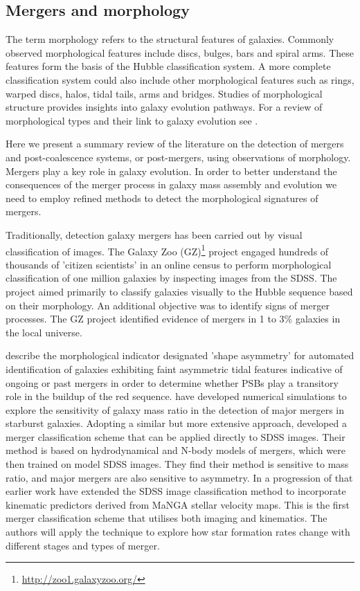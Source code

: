 \subsection{Mergers and morphology}
\label{sec:mergers}

The term morphology refers to the structural features of galaxies. Commonly observed morphological features include discs, bulges, bars and spiral arms. These features form the basis of the Hubble classification system. A more complete classification system could also include other morphological features such as rings, warped discs, halos, tidal tails, arms and bridges. Studies of  morphological structure provides insights into galaxy evolution pathways. For a review of morphological types and their link to galaxy evolution see \cite{2011arXiv1102.0550B}.

Here we present a summary review of the literature on the detection of mergers and post-coalescence systems, or post-mergers, using observations of morphology. Mergers play a key role in galaxy evolution. In order to better understand the consequences of the merger process in galaxy mass assembly and evolution we need to employ refined methods to detect the morphological signatures of mergers.

Traditionally, detection galaxy mergers has been carried out by visual classification of images. The Galaxy Zoo (GZ)\footnote{\href{http://zoo1.galaxyzoo.org/}{http://zoo1.galaxyzoo.org/}} project \citet{10.1111/j.1365-2966.2008.13689.x,10.1111/j.1365-2966.2010.17432.x, 2017MNRAS.464.4176W} engaged hundreds of thousands of 'citizen scientists' in an online census to perform morphological classification of one million galaxies by inspecting images from the SDSS. The project aimed primarily to classify galaxies visually to the Hubble sequence based on their morphology. An additional objective was to identify signs of merger processes. The GZ project identified evidence of mergers in 1 to 3\% galaxies in the local universe.

\cite{2016MNRAS.456.3032P} describe the morphological indicator designated 'shape asymmetry' for automated identification of galaxies exhibiting faint asymmetric tidal features indicative of ongoing or past mergers in order to determine whether PSBs play a transitory role in the buildup of the red sequence. \cite{2011arXiv1102.0550B} have developed numerical simulations to explore the sensitivity of galaxy mass ratio in the detection of major mergers in starburst galaxies. Adopting a similar but more extensive approach, \cite{2019ApJ...872...76N} developed a merger classification scheme that can be applied directly to SDSS images. Their method is based on hydrodynamical and N-body models of mergers, which were then trained on model SDSS images. They find their method is sensitive to mass ratio, and major mergers are also sensitive to asymmetry. In a progression of that earlier work  \cite{2019DDA....5020304N} have extended the SDSS image classification method to incorporate kinematic predictors derived from MaNGA stellar velocity maps. This is the first merger classification scheme that utilises both imaging and kinematics. The authors will apply the technique to explore how star formation rates change with different stages and types of merger. 

